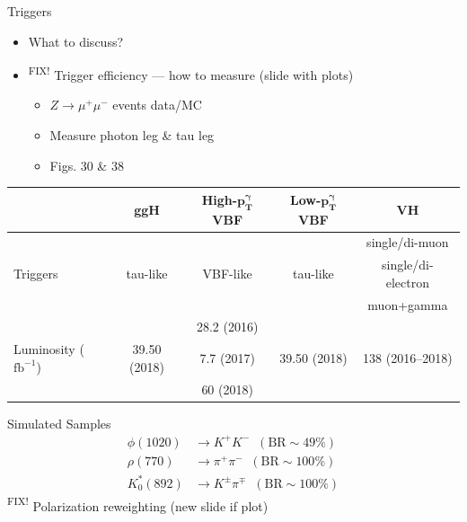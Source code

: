 \documentclass[9pt,aspectratio=1610]{beamer}
\newcommand{\ktodo}[1]{\colorbox{yellow!30}{{\color{red}\textsuperscript{\tiny FIX! }}#1}}
\begin{document}
\begin{frame}{Triggers}
	\begin{itemize}
		\item {\color{red}What to discuss?}
		\item \ktodo{Trigger efficiency --- how to measure (slide with plots)}
		\begin{itemize}
			\item \(Z\rightarrow \mu^+\mu^-\) events data/MC
			\item Measure photon leg \& tau leg
			\item Figs. 30 \& 38
		\end{itemize}
	\end{itemize}
	\begin{table}
		\centering
		\small
		\begin{tabular}{|l|c|c|c|c|}
			\hline
			& \textbf{ggH} & \textbf{High-\(\mathbf{p^\gamma_T}\) VBF} & \textbf{Low-\(\mathbf{p^\gamma_T}\) VBF} & \textbf{VH} \\
			\hline
			& & & & single/di-muon\\
			Triggers & tau-like & VBF-like & tau-like & single/di-electron\\
			& & & & muon+gamma\\
			\hline
			& & 28.2 (2016) & & \\
			Luminosity (\(\mathrm{fb^{-1}}\)) & 39.50 (2018) & 7.7 (2017) & 39.50 (2018) & 138 (2016--2018) \\
			& & 60 (2018) & & \\
			\hline	
		\end{tabular}
	\end{table}
\end{frame}

\begin{frame}{Simulated Samples}
	\begin{align*}
		\phi(1020)&\rightarrow K^+K^-\;\;(\mathrm{BR} \sim 49\%)\\
		\rho(770)&\rightarrow \pi^+\pi^-\;\;(\mathrm{BR} \sim 100\%)\\
		K^*_0(892)&\rightarrow K^\pm\pi^\mp\;\;(\mathrm{BR} \sim 100\%)
	\end{align*}
	\ktodo{Polarization reweighting (new slide if plot)}
\end{frame}
\end{document}
